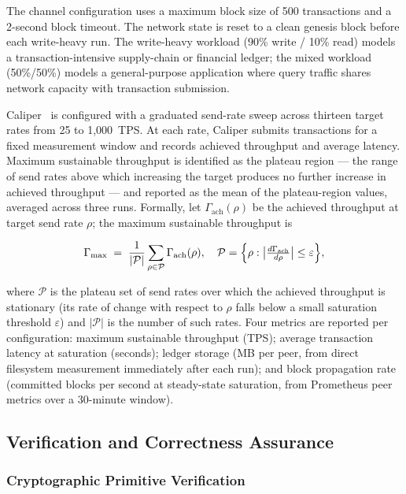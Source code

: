 \documentclass{ieeetj}
\begin{document}
The channel configuration uses a maximum block size of 500 transactions and a
2-second block timeout. The network state is reset to a clean genesis block
before each write-heavy run. The write-heavy workload (90\% write / 10\% read)
models a transaction-intensive supply-chain or financial ledger; the mixed
workload (50\%/50\%) models a general-purpose application where query traffic
shares network capacity with transaction submission.

Caliper~\cite{caliper2023} is configured with a graduated send-rate sweep across
thirteen target rates from 25 to 1{,}000~TPS. At each rate, Caliper submits
transactions for a fixed measurement window and records achieved throughput and
average latency. Maximum sustainable throughput is identified as the plateau
region --- the range of send rates above which increasing the target produces no
further increase in achieved throughput --- and reported as the mean of the
plateau-region values, averaged across three runs. Formally, let
$\Gamma_{\mathrm{ach}}(\rho)$ be the achieved throughput at target send rate
$\rho$; the maximum sustainable throughput is

\begin{equation}
\Gamma_{\max} \;=\; \frac{1}{|\mathcal{P}|}\sum_{\rho\in\mathcal{P}}\Gamma_{\mathrm{ach}}(\rho),
\quad
\mathcal{P}=\Bigl\{\rho:\bigl|\tfrac{d\Gamma_{\mathrm{ach}}}{d\rho}\bigr|\le\varepsilon\Bigr\},
\label{eq:plateau}
\end{equation}

where $\mathcal{P}$ is the plateau set of send rates over which the achieved
throughput is stationary (its rate of change with respect to $\rho$ falls below a
small saturation threshold $\varepsilon$) and $|\mathcal{P}|$ is the number of
such rates. Four metrics are reported per configuration: maximum sustainable
throughput (TPS); average transaction latency at saturation (seconds); ledger
storage (MB per peer, from direct filesystem measurement immediately after each
run); and block propagation rate (committed blocks per second at steady-state
saturation, from Prometheus peer metrics over a 30-minute window).

\subsection{Verification and Correctness Assurance}
\label{sec:exp_verify}

\subsubsection{Cryptographic Primitive Verification}
\end{document}

